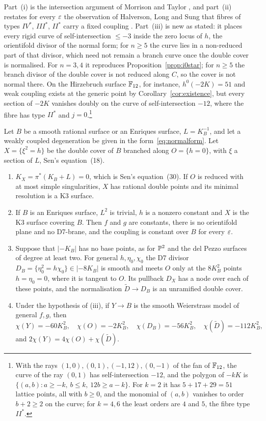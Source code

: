 Part~(i) is the intersection argument of Morrison and Taylor \cite{MT12}, and part~(ii) restates for every $\varepsilon$ the observation of Halverson, Long and Sung that fibres of types $IV^*$, $III^*$, $II^*$ carry a fixed coupling \cite[Table~1 and Section~2.1]{HLS18}. Part~(iii) is new as stated: it places every rigid curve of self-intersection $\le-3$ inside the zero locus of $h$, the orientifold divisor of the normal form; for $n\ge5$ the curve lies in a non-reduced part of that divisor, which need not remain a branch curve once the double cover is normalised. For $n=3,4$ it reproduces Proposition~\ref{prop:i0star}; for $n\ge5$ the branch divisor of the double cover is not reduced along $C$, so the cover is not normal there. On the Hirzebruch surface $\mathbb{F}_{12}$, for instance, $h^0(-2K)=51$ and weak coupling exists at the generic point by Corollary~\ref{cor:existence}, but every section of $-2K$ vanishes doubly on the curve of self-intersection $-12$, where the fibre has type $II^*$ and $j=0$.\footnote{With the rays $(1,0),(0,1),(-1,12),(0,-1)$ of the fan of $\mathbb{F}_{12}$, the curve of the ray $(0,1)$ has self-intersection $-12$, and the polygon of $-kK$ is $\{(a,b):a\ge-k,\ b\le k,\ 12b\ge a-k\}$. For $k=2$ it has $5+17+29=51$ lattice points, all with $b\ge0$, and the monomial of $(a,b)$ vanishes to order $b+2\ge2$ on the curve; for $k=4,6$ the least orders are $4$ and $5$, the fibre type $II^*$.}

\begin{corollary}\label{cor:k3cover}
Let $B$ be a smooth rational surface or an Enriques surface, $L=K_B^{-1}$, and let a weakly coupled degeneration be given in the form~\eqref{eq:normalform}. Let $X=\{\xi^2=h\}$ be the double cover of $B$ branched along $O=\{h=0\}$, with $\xi$ a section of $L$, Sen's equation~(18).
\begin{enumerate}[label=(\roman*),leftmargin=2em]
\item $K_X=\pi^*(K_B+L)=0$, which is Sen's equation~(30). If $O$ is reduced with at most simple singularities, $X$ has rational double points and its minimal resolution is a K3 surface.
\item If $B$ is an Enriques surface, $L^2$ is trivial, $h$ is a nonzero constant and $X$ is the K3 surface covering $B$. Then $f$ and $g$ are constants, there is no orientifold plane and no D7-brane, and the coupling is constant over $B$ for every $\varepsilon$.
\item Suppose that $|{-K_B}|$ has no base points, as for $\mathbb{P}^2$ and the del Pezzo surfaces of degree at least two. For general $h,\eta_0,\chi_0$ the D7 divisor $D_B=\{\eta_0^2=h\chi_0\}\in|{-8K_B}|$ is smooth and meets $O$ only at the $8K_B^2$ points $h=\eta_0=0$, where it is tangent to $O$. Its pullback $D_X$ has a node over each of these points, and the normalisation $\widetilde D\to D_B$ is an unramified double cover.
\item Under the hypothesis of (iii), if $Y\to B$ is the smooth Weierstrass model of general $f,g$, then
\[
\chi(Y)=-60K_B^2,\quad\chi(O)=-2K_B^2,\quad\chi(D_B)=-56K_B^2,\quad\chi(\widetilde D)=-112K_B^2,
\]
and $2\chi(Y)=4\chi(O)+\chi(\widetilde D)$.
\end{enumerate}
\end{corollary}

